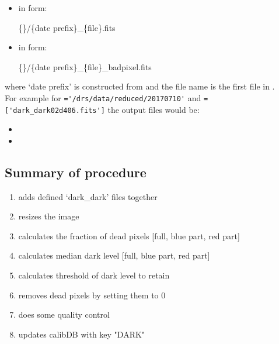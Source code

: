 \begin{itemize}
\item {} in form:
\begin{tcustomdir}
\{\reduceddir\}/\{date prefix\}\_\{file\}.fits
\end{tcustomdir}

\item {} in form:
\begin{tcustomdir}
\{\reduceddir\}/\{date prefix\}\_\{file\}\_badpixel.fits
\end{tcustomdir}
\end{itemize}

\noindent where `date prefix' is constructed from \argnightname and the file name is the first file in \argfilenames. \\

\noindent For example for \reduceddir\lstinline[style=pythoninline]|='/drs/data/reduced/20170710'| and \argfilenames\lstinline[style=pythoninline]|=['dark_dark02d406.fits']| the output files would be:
\begin{tcustomdir}
\begin{itemize}
\item {}
\item {}
\end{itemize}
\end{tcustomdir}

\subsection{Summary of procedure}
\begin{enumerate}
\item adds defined `dark\_dark' files together
\item resizes the image
\item calculates the fraction of dead pixels [full, blue part, red part]
\item calculates median dark level [full, blue part, red part]
\item calculates threshold of dark level to retain
\item removes dead pixels by setting them to 0
\item does some quality control
\item updates calibDB with key "DARK"
\end{enumerate}


